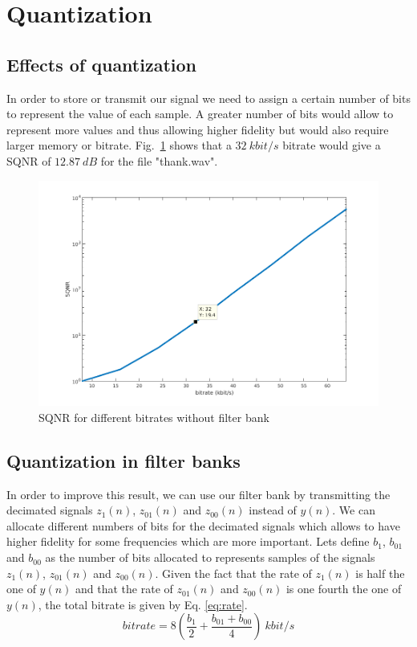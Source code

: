 \documentclass[a4paper,twocolumn]{article}
\begin{document}
\section{Quantization}
\label{sec:quantization}

\subsection{Effects of quantization}
\label{sec:quantizationeffect}
In order to store or transmit our signal we need to assign a certain number of bits to represent the value of each sample. A greater number of bits would allow to represent more values and thus allowing higher fidelity but would also require larger memory or bitrate. Fig.~\ref{fig:quant} shows that a $32~kbit/s$ bitrate would give a SQNR of $12.87~dB$ for the file "thank.wav".

\begin{figure}[!ht]
  \begin{center}
    \includegraphics[width=1.1\columnwidth]{quantization.png}
  \end{center}
  \caption{SQNR for different bitrates without filter bank}
  \label{fig:quant}
\end{figure}

\subsection{Quantization in filter banks}
In order to improve this result, we can use our filter bank by transmitting the decimated signals $z_{1}(n)$, $z_{01}(n)$ and $z_{00}(n)$ instead of $y(n)$. We can allocate different numbers of bits for the decimated signals which allows to have higher fidelity for some frequencies which are more important.
Lets define $b_{1}$, $b_{01}$ and $b_{00}$ as the number of bits allocated to represents samples of the signals $z_{1}(n)$, $z_{01}(n)$ and $z_{00}(n)$.
Given the fact that the rate of $z_{1}(n)$ is half the one of $y(n)$ and that the rate of $z_{01}(n)$ and $z_{00}(n)$ is one fourth the one of $y(n)$, the total bitrate is given by Eq. \ref{eq:rate}.
\begin{equation}
  \label{eq:rate}
  bitrate = 8(\frac{b_{1}}{2}+\frac{b_{01}+b_{00}}{4})~kbit/s
\end{equation}
\end{document}
